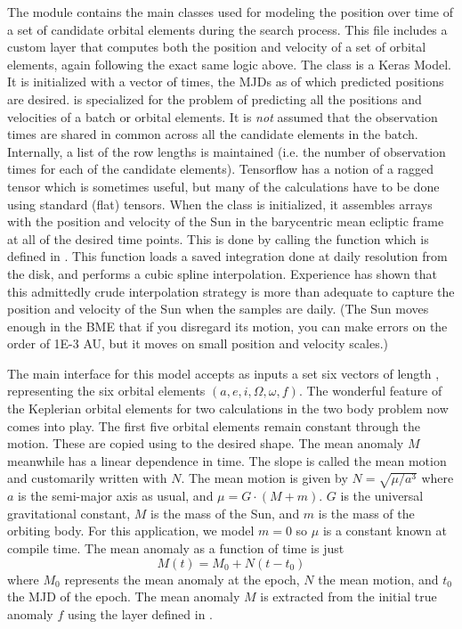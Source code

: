 The module  contains the main classes used for modeling the position over time
of a set of candidate orbital elements during the search process.
This file includes a custom layer  that computes both the position 
and velocity of a set of orbital elements, again following the exact same logic above.
The class  is a Keras Model.
It is initialized with a vector of times, the MJDs as of which predicted positions are desired.
 is specialized for the problem of predicting all the positions and velocities of a batch or orbital elements.
It is \textit{not} assumed that the observation times are shared in common across all the candidate elements in the batch.
Internally, a list of the row lengths is maintained (i.e. the number of observation times for each of the candidate elements).
Tensorflow has a notion of a ragged tensor which is sometimes useful, but many of the calculations have to be done using standard (flat) tensors.
When the class is initialized, it assembles arrays with the position and velocity of the Sun 
in the barycentric mean ecliptic frame at all of the desired time points.  
This is done by calling the function  which is defined in .
This function loads a saved integration done at daily resolution from the disk, and performs a cubic spline interpolation.
Experience has shown that this admittedly crude interpolation strategy 
is more than adequate to capture the position and velocity of the Sun when the samples are daily.
(The Sun moves enough in the BME that if you disregard its motion, you can make errors on the order of 1E-3 AU, 
but it moves on small position and velocity scales.)

The main interface for this model accepts as inputs a set six vectors of length , 
representing the six orbital elements $(a, e, i, \Omega, \omega, f)$.
The wonderful feature of the Keplerian orbital elements for two calculations in the two body problem now comes into play.
The first five orbital elements remain constant through the motion.
These are copied using  to the desired shape.
The mean anomaly $M$ meanwhile has a linear dependence in time.
The slope is called the mean motion and customarily written with $N$.  The mean motion is given by 
$N = \sqrt{\mu / a^3}$
where $a$ is the semi-major axis as usual, and $\mu = G \cdot (M + m)$.
$G$ is the universal gravitational constant, $M$ is the mass of the Sun, and $m$ is the mass of the orbiting body.
For this application, we model $m=0$ so $\mu$ is a constant known at compile time.
The mean anomaly as a function of time is just
$$M(t) = M_0 + N(t - t_0)$$
where $M_0$ represents the mean anomaly at the epoch, $N$ the mean motion, and $t_0$ the MJD of the epoch.
The mean anomaly $M$ is extracted from the initial true anomaly $f$ using the layer  defined in .

